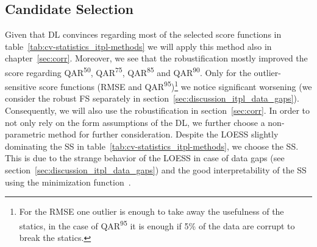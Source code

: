 {    \subsection{Candidate Selection}{\label{sec:itpl_candiate_selection}
        Given that DL convinces regarding most of the selected score functions in table~\ref{tab:cv-statistics_itpl-methods} we will apply this method also in chapter~\ref{sec:corr}. Moreover, we see that the robustification mostly improved the score regarding QAR\textsuperscript{50}, QAR\textsuperscript{75}, QAR\textsuperscript{85} and QAR\textsuperscript{90}. Only for the outlier-sensitive score functions (RMSE and QAR\textsuperscript{95})\footnote{For the RMSE one outlier is enough to take away the usefulness of the statics, in the case of QAR\textsuperscript{95} it is enough if 5\% of the data are corrupt to break the statics.} we notice significant worsening (we consider the robust FS separately in section~\ref{sec:discussion_itpl_data_gaps}). Consequently, we will also use the robustification in section~\ref{sec:corr}.
        In order to not only rely on the form assumptions of the DL, we further choose a non-parametric method for further consideration. Despite the LOESS slightly dominating the SS in table~\ref{tab:cv-statistics_itpl-methods}, we choose the SS. This is due to the strange behavior of the LOESS in case of data gaps (see section~\ref{sec:discussion_itpl_data_gaps}) and the good interpretability of the SS using the minimization function~.
    }
}


